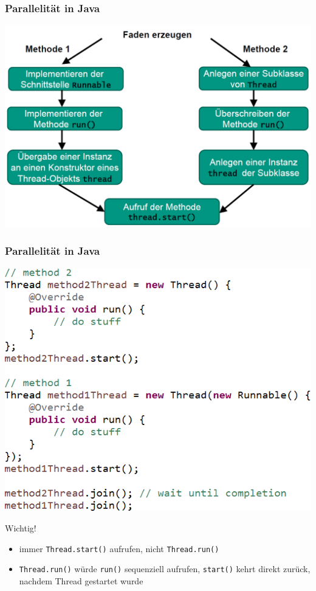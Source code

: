 \documentclass[18pt]{beamer}
\begin{document}
	\begin{frame}
		\frametitle{Parallelität in Java}
		\includegraphics[scale=0.34]{./pics/tut5/crea-thr.png}
	\end{frame}

	\begin{frame}
		\frametitle{Parallelität in Java}
		\centering
		\includegraphics[scale=0.43]{./pics/tut5/crea-thr-java.png}
		\pause
		\begin{alertblock}{Wichtig!}
			\begin{itemize}
				\item immer \texttt{Thread.start()} aufrufen, nicht \texttt{Thread.run()} \pause
				\item \texttt{Thread.run()} würde \texttt{run()} sequenziell aufrufen, \texttt{start()} kehrt direkt zurück, nachdem Thread gestartet wurde
			\end{itemize}
		\end{alertblock}
	\end{frame}
\end{document}

